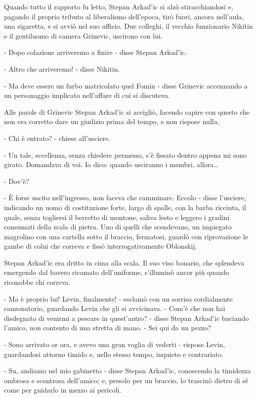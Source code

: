 Quando tutto il rapporto fu letto, Stepan Arkad'ic si alzò stiracchiandosi e, pagando il proprio tributo al liberalismo dell'epoca, tirò fuori, ancora nell'aula, una sigaretta, e si avviò nel suo ufficio. Due colleghi, il vecchio funzionario Nikitin e il gentiluomo di camera Grinevic, uscirono con lui. 

- Dopo colazione arriveremo a finire - disse Stepan Arkad'ic. 

- Altro che arriveremo! - disse Nikitin. 

- Ma deve essere un furbo matricolato quel Fomin - disse Grinevic accennando a un personaggio implicato nell'affare di cui si discuteva. 

Alle parole di Grinevic Stepan Arkad'ic si accigliò, facendo capire con questo che non era corretto dare un giudizio prima del tempo, e non rispose nulla. 

- Chi è entrato? - chiese all'usciere. 

- Un tale, eccellenza, senza chiedere permesso, s'è fissato dentro appena mi sono girato. Domandava di voi. Io dico: quando usciranno i membri, allora\ldots{} 

- Dov'è? 

- È forse uscito nell'ingresso, non faceva che camminare. Eccolo - disse l'usciere, indicando un uomo di costituzione forte, largo di spalle, con la barba ricciuta, il quale, senza togliersi il berretto di montone, saliva lesto e leggero i gradini consumati della scala di pietra. Uno di quelli che scendevano, un impiegato magrolino con una cartella sotto il braccio, fermatosi, guardò con riprovazione le gambe di colui che correva e fissò interrogativamente Oblonskij. 

Stepan Arkad'ic era dritto in cima alla scala. Il suo viso bonario, che splendeva emergendo dal bavero ricamato dell'uniforme, s'illuminò ancor più quando riconobbe chi correva. 

- Ma è proprio lui! Levin, finalmente! - esclamò con un sorriso cordialmente canzonatorio, guardando Levin che gli si avvicinava. - Com'è che non hai disdegnato di venirmi a pescare in quest'antro? - disse Stepan Arkad'ic baciando l'amico, non contento di una stretta di mano. - Sei qui da un pezzo? 

- Sono arrivato or ora, e avevo una gran voglia di vederti - rispose Levin, guardandosi attorno timido e, nello stesso tempo, inquieto e contrariato. 

- Su, andiamo nel mio gabinetto - disse Stepan Arkad'ic, conoscendo la timidezza ombrosa e scontrosa dell'amico; e, presolo per un braccio, lo trascinò dietro di sé come per guidarlo in mezzo ai pericoli. 

